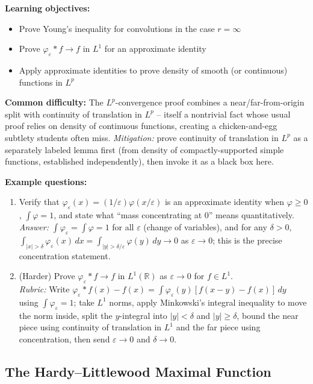 \documentclass[11pt]{article}
\begin{document}
\textbf{Learning objectives:}
\begin{itemize}[nosep]
\item Prove Young's inequality for convolutions in the case $r=\infty$
\item Prove $\varphi_\varepsilon*f\to f$ in $L^1$ for an approximate identity
\item Apply approximate identities to prove density of smooth (or continuous) functions in $L^p$
\end{itemize}

\textbf{Common difficulty:} The $L^p$-convergence proof combines a near/far-from-origin split with continuity of translation in $L^p$ -- itself a nontrivial fact whose usual proof relies on density of continuous functions, creating a chicken-and-egg subtlety students often miss. \textit{Mitigation:} prove continuity of translation in $L^p$ as a separately labeled lemma first (from density of compactly-supported simple functions, established independently), then invoke it as a black box here.

\textbf{Example questions:}
\begin{enumerate}[nosep]
\item Verify that $\varphi_\varepsilon(x)=(1/\varepsilon)\varphi(x/\varepsilon)$ is an approximate identity when $\varphi\ge0$, $\int\varphi=1$, and state what ``mass concentrating at $0$'' means quantitatively. \\
\textit{Answer:} $\int\varphi_\varepsilon=\int\varphi=1$ for all $\varepsilon$ (change of variables), and for any $\delta>0$, $\int_{|x|>\delta}\varphi_\varepsilon(x)\,dx=\int_{|y|>\delta/\varepsilon}\varphi(y)\,dy\to0$ as $\varepsilon\to0$; this is the precise concentration statement.
\item (Harder) Prove $\varphi_\varepsilon*f\to f$ in $L^1(\mathbb{R})$ as $\varepsilon\to0$ for $f\in L^1$. \\
\textit{Rubric:} Write $\varphi_\varepsilon*f(x)-f(x)=\int\varphi_\varepsilon(y)[f(x-y)-f(x)]\,dy$ using $\int\varphi_\varepsilon=1$; take $L^1$ norms, apply Minkowski's integral inequality to move the norm inside, split the $y$-integral into $|y|<\delta$ and $|y|\ge\delta$, bound the near piece using continuity of translation in $L^1$ and the far piece using concentration, then send $\varepsilon\to0$ and $\delta\to0$.
\end{enumerate}

\subsection{The Hardy--Littlewood Maximal Function}
\end{document}
